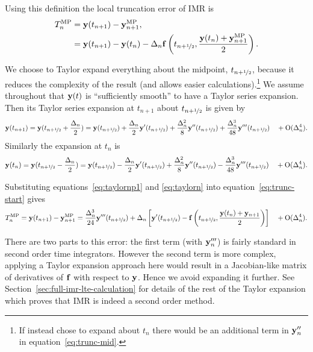 Using this definition the local truncation error of IMR is
\begin{align}
  \lte^\IMP &= \yv(t_{n+1}) - \yv_{n+1}^\IMP, \notag\\
  &= \yv(t_{n+1}) - \yv(t_n) - \dtn \fv\left( \thf, \frac{\yv(t_n) + \yv_{n+1}^\IMP}{2} \right).
  \label{eq:trunc-start}
\end{align}

We choose to Taylor expand everything about the midpoint, $t_{n+\nicefrac{1}{2}}$, because it reduces the complexity of the result (and allows easier calculations).\footnote{If instead chose to expand about $t_n$ there would be an additional term in $\mathbf{y}_n''$ in equation~\eqref{eq:trunc-mid}.}
We assume throughout that $\mathbf{y}(t)$ is ``sufficiently smooth'' to have a Taylor series expansion. Then its Taylor series expansion at $t_{n+1}$ about $t_{n+\nicefrac{1}{2}}$ is given by
\begin{equation}
  \yv(t_{n+1}) = \yv(\thf + \frac{\dtn}{2}) = \yvhf + \frac{\dtn}{2} \yvhf['] + \frac{\dtn^2}{8} \yvhf[''] + \frac{\dtn^3}{48} \yvhf['''] \porder{\dtn^4}.
  \label{eq:taylornp1}
\end{equation}
Similarly the expansion at $t_n$ is
\begin{equation}
  \yv(t_n) = \yv(\thf - \frac{\dtn}{2}) = \yvhf - \frac{\dtn}{2} \yvhf['] + \frac{\dtn^2}{8} \yvhf[''] - \frac{\dtn^3}{48} \yvhf['''] \porder{\dtn^4}.
  \label{eq:taylorn}
\end{equation}

Substituting equations~\eqref{eq:taylornp1} and \eqref{eq:taylorn} into equation~\eqref{eq:trunc-start} gives
\begin{equation}
  \lte^\IMP = \yv(t_{n+1}) - \yv_{n+1}^\IMP
  = \frac{\dtn^3}{24} \yvhf[''']  + \dtn  \left[ \yvhf[']
  - \fv\left( \thf, \frac{\yv(t_n) + \yv_{n+1}}{2} \right) \right]  \porder{\dtn^4}.
  \label{eq:trunc-mid}
\end{equation}

There are two parts to this error: the first term (with $\mathbf{y}'''_n$) is fairly standard in second order time integrators.
However the second term is more complex, applying a Taylor expansion approach here would result in a Jacobian-like matrix of derivatives of ${\mathbf{f}}$ with respect to $\mathbf{y}$.
Hence we avoid expanding it further.
See Section~\ref{sec:full-imr-lte-calculation} for details of the rest of the Taylor expansion which proves that IMR is indeed a second order method.



